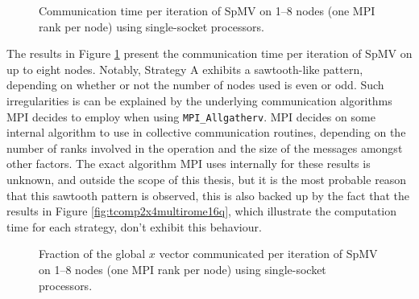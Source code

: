 \begin{figure}[H]
    \centering
    \caption{Communication time per iteration of SpMV on 1–8 nodes (one MPI rank per node) using single-socket \romeq{} processors.}
    \label{fig:tcommromemulti}
\end{figure}

The results in Figure \ref{fig:tcommromemulti} present the communication time per iteration of SpMV on up to eight \romeq{} nodes. Notably, Strategy A exhibits a sawtooth-like pattern, depending on whether or not the number of nodes used is even or odd. Such irregularities is can be explained by the underlying communication algorithms MPI decides to employ when using \texttt{MPI\_Allgatherv}. MPI decides on some internal algorithm to use in collective communication routines, depending on the number of ranks involved in the operation and the size of the messages amongst other factors. The exact algorithm MPI uses internally for these results is unknown, and outside the scope of this thesis, but it is the most probable reason that this sawtooth pattern is observed, this is also backed up by the fact that the results in Figure \ref{fig:tcomp2x4multirome16q}, which illustrate the computation time for each strategy, don't exhibit this behaviour.

\begin{figure}[H]
    \centering
    \caption{Fraction of the global \(x\) vector communicated per iteration of SpMV on 1–8 nodes (one MPI rank per node) using single-socket \romeq{} processors.}
    \label{fig:commlaoadromemulti}
\end{figure}
